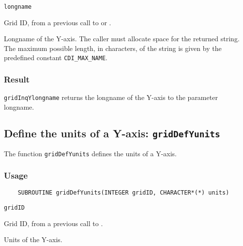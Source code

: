 \hspace*{4mm}\begin{minipage}[]{15cm}
\begin{deflist}{\tt longname\ }
\item[{\tt gridID}]
Grid ID, from a previous call to {} or {}.
\item[{\tt longname}]
Longname of the Y-axis. The caller must allocate space for the
                    returned string. The maximum possible length, in characters, of
                    the string is given by the predefined constant {\tt CDI\_MAX\_NAME}.

\end{deflist}
\end{minipage}

\subsubsection*{Result}

{\tt gridInqYlongname} returns the longname of the Y-axis to the parameter longname.



\subsection{Define the units of a Y-axis: {\tt gridDefYunits}}
\label{gridDefYunits}

The function {\tt gridDefYunits} defines the units of a Y-axis.

\subsubsection*{Usage}

\begin{verbatim}
    SUBROUTINE gridDefYunits(INTEGER gridID, CHARACTER*(*) units)
\end{verbatim}

\hspace*{4mm}\begin{minipage}[]{15cm}
\begin{deflist}{\tt gridID\ }
\item[{\tt gridID}]
Grid ID, from a previous call to {}.
\item[{\tt units}]
Units of the Y-axis.

\end{deflist}
\end{minipage}


